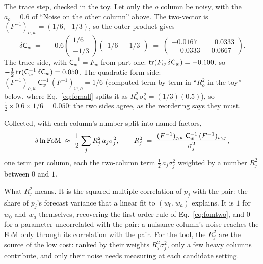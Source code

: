 \documentclass[11pt]{article}
\newcommand{\Cov}{\mathsf{C}}
\begin{document}
The trace step, checked in the toy.  Let only the $o$ column be noisy,
with the $a_o = 0.6$ of ``Noise on the other column'' above.  The
two-vector is $(F^{-1})_{o,w} = (1/6, -1/3)$, so the outer product
gives
\begin{equation*}
  \delta\Cov_w \;=\; -\,0.6
  \begin{pmatrix} 1/6 \\ -1/3 \end{pmatrix}
  \begin{pmatrix} 1/6 & -1/3 \end{pmatrix}
  \;=\;
  \begin{pmatrix} -0.0167 & \phantom{-}0.0333 \\
    \phantom{-}0.0333 & -0.0667 \end{pmatrix} .
\end{equation*}
The trace side, with $\Cov_w^{-1} = F_w$ from part one:
${\rm tr}(F_w\,\delta\Cov_w) = -0.100$, so
$-\tfrac{1}{2}\,{\rm tr}(\Cov_w^{-1}\,\delta\Cov_w) = 0.050$.  The
quadratic-form side:
$(F^{-1})_{o,w}\,\Cov_w^{-1}\,(F^{-1})_{w,o} = 1/6$ (computed term by
term in ``$R_o^2$ in the toy'' below, where Eq.~\eqref{eq:fomall}
splits it as $R_o^2\,\sigma_o^2 = (1/3)(0.5)$), so
$\tfrac{1}{2} \times 0.6 \times 1/6 = 0.050$: the two sides agree, as
the reordering says they must.

Collected, with each column's number split into named factors,
\begin{equation}
  \delta\ln{\rm FoM} \;\approx\; \frac{1}{2}\sum_j R_j^2\,a_j\sigma_j^2 ,
  \qquad
  R_j^2 \;=\; \frac{(F^{-1})_{j,w}\,\Cov_w^{-1}\,(F^{-1})_{w,j}}
  {\sigma_j^2} ,
  \label{eq:fomall}
\end{equation}
one term per column, each the two-column term
$\tfrac{1}{2}\,a_j\sigma_j^2$ weighted by a number $R_j^2$ between $0$
and $1$.

What $R_j^2$ means.  It is the squared multiple correlation of $p_j$
with the pair: the share of $p_j$'s forecast variance that a linear
fit to $(w_0, w_a)$ explains.  It is $1$ for $w_0$ and $w_a$
themselves, recovering the first-order rule of Eq.~\eqref{eq:fomtwo},
and $0$ for a parameter uncorrelated with the pair: a nuisance
column's noise reaches the FoM only through its correlation with the
pair.  For the tool, the $R_j^2$ are the source of the low cost:
ranked by their weights $R_j^2\sigma_j^2$, only a few heavy columns
contribute, and only their noise needs measuring at each candidate
setting.
\end{document}
